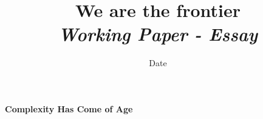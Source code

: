 


\title{We are the frontier\bigskip\\
\textit{Working Paper - Essay}
}
\author{}
\date{Date}


\maketitle

\justify


\begin{abstract}

\end{abstract}

\paragraph{Complexity Has Come of Age}



